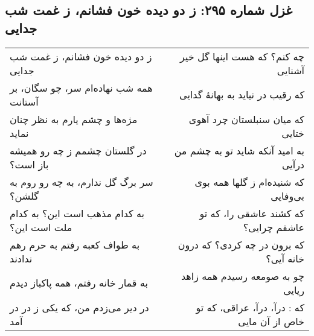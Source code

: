 \begin{center}
\section*{غزل شماره ۲۹۵: ز دو دیده خون فشانم، ز غمت شب جدایی}
\label{sec:295}
\begin{longtable}{l p{0.5cm} r}
ز دو دیده خون فشانم، ز غمت شب جدایی
&&
چه کنم؟ که هست اینها گل خیر آشنایی
\\
همه شب نهاده‌ام سر، چو سگان، بر آستانت
&&
که رقیب در نیاید به بهانهٔ گدایی
\\
مژه‌ها و چشم یارم به نظر چنان نماید
&&
که میان سنبلستان چرد آهوی ختایی
\\
در گلستان چشمم ز چه رو همیشه باز است؟
&&
به امید آنکه شاید تو به چشم من درآیی
\\
سر برگ گل ندارم، به چه رو روم به گلشن؟
&&
که شنیده‌ام ز گلها همه بوی بی‌وفایی
\\
به کدام مذهب است این؟ به کدام ملت است این؟
&&
که کشند عاشقی را، که تو عاشقم چرایی؟
\\
به طواف کعبه رفتم به حرم رهم ندادند
&&
که برون در چه کردی؟ که درون خانه آیی؟
\\
به قمار خانه رفتم، همه پاکباز دیدم
&&
چو به صومعه رسیدم همه زاهد ریایی
\\
در دیر می‌زدم من، که یکی ز در در آمد
&&
که : درآ، درآ، عراقی، که تو خاص از آن مایی
\\
\end{longtable}
\end{center}
